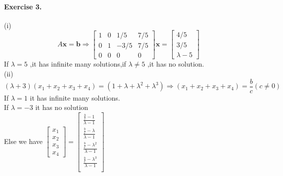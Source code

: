 \documentclass{article}
\begin{document}
\paragraph{Exercise 3.}
(i)\[
A\mathbf{x}=\mathbf{b} \Rightarrow \begin{bmatrix}
    1 & 0 & 1/5 & 7/5\\
    0 & 1 & -3/5 & 7/5\\
    0 & 0 & 0 & 0
\end{bmatrix}\mathbf{x}=\begin{bmatrix}
    4/5\\3/5\\ \lambda-5
\end{bmatrix}
\]
If $\lambda = 5$ ,it has infinite many solutions,if $\lambda \neq 5$ ,it has no solution.\\
(ii)\[
(\lambda + 3)(x_1+x_2+x_3+x_4)= (1 + \lambda + \lambda^2 + \lambda^3) \Rightarrow (x_1+x_2+x_3+x_4)=\frac{b}{c} (c \neq 0)
\]
If  $\lambda = 1$ it has infinite many solutions.\\
If $\lambda = -3$ it has no solution\\
Else we have $\begin{bmatrix}
    x_1\\x_2\\x_3\\x_4
\end{bmatrix}=\begin{bmatrix}
    \frac{\frac{b}{c}-1}{\lambda - 1}\\
    \frac{\frac{b}{c}-\lambda}{\lambda - 1}\\
    \frac{\frac{b}{c}-\lambda^2}{\lambda - 1}\\
    \frac{\frac{b}{c}-\lambda^3}{\lambda - 1}\\
\end{bmatrix}$
\end{document}
